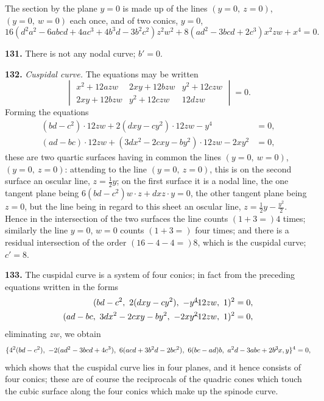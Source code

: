 \documentclass[11pt,a4paper]{article}
\theoremstyle{definition}
\begin{document}
The section by the plane $y=0$ is made up of the lines $(y=0,\ z=0)$, $(y=0,\ w=0)$ each once, and of two conics, $y=0$,
\[
16(d^2a^2-6abcd+4ac^3+4b^3d-3b^2c^2)z^2w^2 + 8(ad^2-3bcd+2c^3)x^2zw + x^4 = 0.
\]

\noindent\textbf{131.} There is not any nodal curve; $b'=0$.

\noindent\textbf{132.} \textit{Cuspidal curve.} The equations may be written
\[
\begin{vmatrix}
x^2+12azw & 2xy+12bzw & y^2+12czw \\
2xy+12bzw & y^2+12czw & 12dzw
\end{vmatrix}=0.
\]
Forming the equations
\begin{align*}
(bd-c^2)\cdot 12zw + 2(dxy-cy^2)\cdot 12zw - y^4 &= 0,\\
(ad-bc)\cdot 12zw + (3dx^2-2cxy-by^2)\cdot 12zw - 2xy^2 &= 0,
\end{align*}
these are two quartic surfaces having in common the lines $(y=0,\ w=0)$, $(y=0,\ z=0)$: attending to the line $(y=0,\ z=0)$, this is on the second surface an oscular line, $z=\frac{1}{2}y$; on the first surface it is a nodal line, the one tangent plane being $6(bd-c^2)w\cdot z+dxz\cdot y=0$, the other tangent plane being $z=0$, but the line being in regard to this sheet an oscular line, $z=\frac{1}{2}y-\frac{y^2}{2}$. Hence in the intersection of the two surfaces the line counts $(1+3=)4$ times; similarly the line $y=0$, $w=0$ counts $(1+3=)$ four times; and there is a residual intersection of the order $(16-4-4=)8$, which is the cuspidal curve; $c'=8$.

\setcounter{page}{425}

\noindent\textbf{133.} The cuspidal curve is a system of four conics; in fact from the preceding equations written in the forms
\begin{align*}
(bd-c^2,\ 2(dxy-cy^2),\ -y^4\!\hbox{\hspace{-0.5em}}\raisebox{0.3ex}{$\scriptstyle\frown$}\!12zw,\ 1)^2 &=0,\\
(ad-bc,\ 3dx^2-2cxy-by^2,\ -2xy^2\!\hbox{\hspace{-0.5em}}\raisebox{0.3ex}{$\scriptstyle\frown$}\!12zw,\ 1)^2 &=0,
\end{align*}
eliminating $zw$, we obtain
\[
\{4^2(bd-c^2),\ -2(ad^2-3bcd+4c^3),\ 6(acd+3b^2d-2bc^2),\ 6(bc-ad)b,\ a^2d-3abc+2b^3\!\hbox{\hspace{-0.5em}}\raisebox{0.3ex}{$\scriptstyle\frown$}\!x,y\}^4=0,
\]
which shows that the cuspidal curve lies in four planes, and it hence consists of four conics; these are of course the reciprocals of the quadric cones which touch the cubic surface along the four conics which make up the spinode curve.
\end{document}
